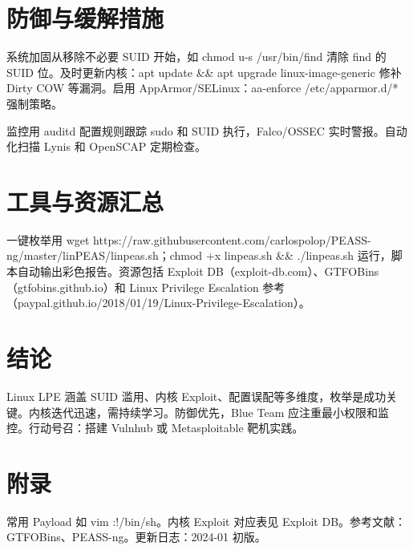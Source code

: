 \chapter{防御与缓解措施}
系统加固从移除不必要 SUID 开始，如 chmod u-s /usr/bin/find 清除 find 的 SUID 位。及时更新内核：apt update \&{}\&{} apt upgrade linux-image-generic 修补 Dirty COW 等漏洞。启用 AppArmor/SELinux：aa-enforce /etc/apparmor.d/* 强制策略。\par
监控用 auditd 配置规则跟踪 sudo 和 SUID 执行，Falco/OSSEC 实时警报。自动化扫描 Lynis 和 OpenSCAP 定期检查。\par
\chapter{工具与资源汇总}
一键枚举用 wget https://raw.githubusercontent.com/carlospolop/PEASS-ng/master/linPEAS/linpeas.sh；chmod +x linpeas.sh \&{}\&{} ./linpeas.sh 运行，脚本自动输出彩色报告。资源包括 Exploit DB（exploit-db.com）、GTFOBins（gtfobins.github.io）和 Linux Privilege Escalation 参考（paypal.github.io/2018/01/19/Linux-Privilege-Escalation）。\par
\chapter{结论}
Linux LPE 涵盖 SUID 滥用、内核 Exploit、配置误配等多维度，枚举是成功关键。内核迭代迅速，需持续学习。防御优先，Blue Team 应注重最小权限和监控。行动号召：搭建 Vulnhub 或 Metasploitable 靶机实践。\par
\chapter{附录}
常用 Payload 如 vim :!/bin/sh。内核 Exploit 对应表见 Exploit DB。参考文献：GTFOBins、PEASS-ng。更新日志：2024-01 初版。\par
